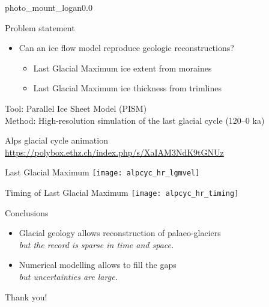     \begin{backgroundframe}[b]{photo_mount_logan}{0.0}{}
    \end{backgroundframe}

    \begin{sectionframe}{Problem statement}
      \begin{itemize}
        \item Can an ice flow model reproduce geologic reconstructions?
          \begin{itemize}
            \item Last Glacial Maximum ice \alert{extent} from moraines
            \item Last Glacial Maximum ice \alert{thickness} from trimlines
          \end{itemize}
      \end{itemize}
      \bigskip\bigskip\bigskip\pause
      Tool: Parallel Ice Sheet Model (PISM)\\
      \bigskip
      Method: High-resolution simulation of the last glacial cycle (120--0 ka)
    \end{sectionframe}

    \begin{frame}{}
      \centering
      Alps glacial cycle animation\\
      \bigskip
      \url{https://polybox.ethz.ch/index.php/s/XaIAM3NdK9tGNUz}
    \end{frame}

    \begin{frame}{Last Glacial Maximum}
      \texttt{[image: alpcyc\_hr\_lgmvel]}
    \end{frame}

    \begin{frame}{Timing of Last Glacial Maximum}
      \texttt{[image: alpcyc\_hr\_timing]}
    \end{frame}

    \begin{sectionframe}{Conclusions}
      \begin{itemize}
        \item Glacial geology allows reconstruction of palaeo-glaciers\\
          \emph{\small but the record is sparse in time and space.}
        \pause\bigskip
        \item Numerical modelling allows to fill the gaps\\
          \emph{\small but uncertainties are large.}
      \end{itemize}
    \end{sectionframe}

    \begin{sectionframe}{Thank you!}
    \end{sectionframe}



